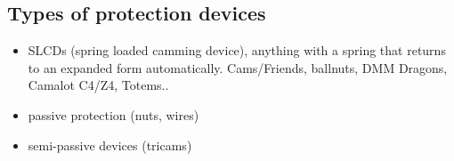 \subsection{Types of protection devices}
\begin{itemize}
\item SLCDs (spring loaded camming device), anything with a spring that returns to an expanded form automatically. Cams/Friends, ballnuts, DMM Dragons, Camalot C4/Z4, Totems..
\item passive protection (nuts, wires)
\item semi-passive devices (tricams)
\end{itemize}

